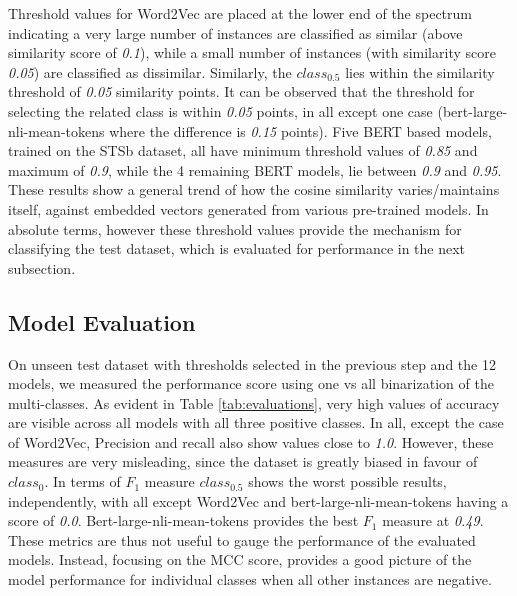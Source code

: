 \documentclass{ieeeaccess}
\begin{document}
Threshold values for Word2Vec are placed at the lower end of the spectrum indicating a very large number of instances are classified as similar (above similarity score of \textit{0.1}), while a small number of instances (with similarity score \textit{0.05}) are classified as dissimilar. Similarly, the $class_{0.5}$ lies within the similarity threshold of \textit{0.05} similarity points. It can be observed that the threshold for selecting the related class is within \textit{0.05} points, in all except one case (bert-large-nli-mean-tokens where the difference is \textit{0.15} points). Five BERT based models, trained on the STSb dataset, all have minimum threshold values of \textit{0.85} and maximum of \textit{0.9}, while the 4 remaining BERT models, lie between \textit{0.9} and \textit{0.95}. These results show a general trend of how the cosine similarity varies/maintains itself, against embedded vectors generated from various pre-trained models. In absolute terms, however these threshold values provide the mechanism for classifying the test dataset, which is evaluated for performance in the next subsection.

\subsection{Model Evaluation}
On unseen test dataset with thresholds selected in the previous step and the 12 models, we measured the performance score using one vs all binarization of the multi-classes. As evident in Table \ref{tab:evaluations}, very high values of accuracy are visible across all models with all three positive classes. In all, except the case of Word2Vec, Precision and recall also show values close to \textit{1.0}. However, these measures are very misleading, since the dataset is greatly biased in favour of $class_0$. In terms of $F_1$ measure $class_{0.5}$ shows the worst possible results, independently, with all except Word2Vec and bert-large-nli-mean-tokens having a score of \textit{0.0}. Bert-large-nli-mean-tokens provides the best $F_1$ measure at \textit{0.49}. These metrics are thus not useful to gauge the performance of the evaluated models. Instead, focusing on the MCC score, provides a good picture of the model performance for individual classes when all other instances are negative.
\end{document}
